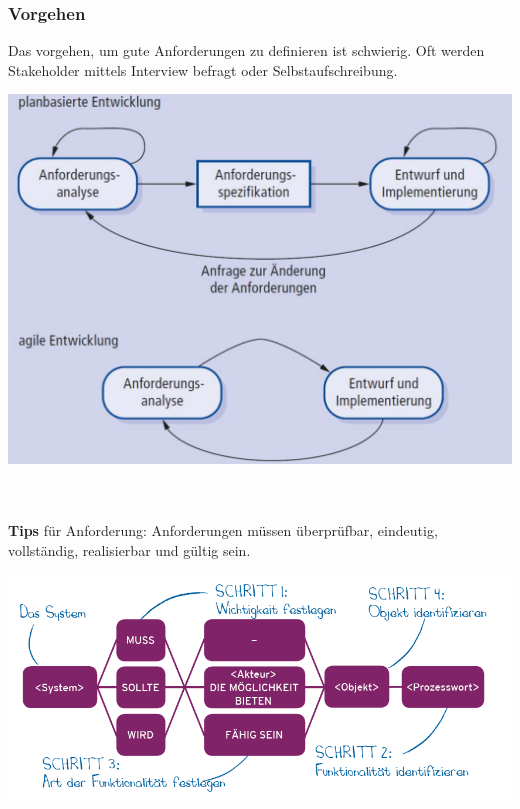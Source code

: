 \subsubsection{Vorgehen}
Das vorgehen, um gute Anforderungen zu definieren ist schwierig. Oft werden Stakeholder mittels Interview befragt oder Selbstaufschreibung.  
\begin{center}
	\includegraphics[width=\columnwidth]{Images/requirements_engeneering}
\end{center}

~\\ ~\\
\textbf{Tips} für Anforderung: Anforderungen müssen überprüfbar, eindeutig, vollständig, realisierbar und gültig sein.
\begin{center}
	\includegraphics[width=\columnwidth]{Images/schablone}
\end{center}

